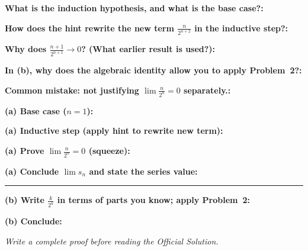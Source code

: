 \documentclass[12pt]{article}
\newcommand{\fillfield}[1]{%
  \par\noindent\textbf{#1:}\enspace\hrulefill\par\vspace{3pt}%
}
\newcommand{\writespace}[1]{\vspace{#1}}
\begin{document}
\bigskip

\begin{tcolorbox}[
  enhanced, breakable,
  colback  = pass3orange,
  colframe = orange!65!black,
  fonttitle = \bfseries,
  title = {Pass 3 \enspace\textbf{--}\enspace Self-Explanation}
]
\fillfield{What is the induction hypothesis, and what is the base case?}
\fillfield{How does the hint rewrite the new term $\frac{n}{2^{n+2}}$ in the inductive step?}
\fillfield{Why does $\frac{n+1}{2^{n+1}} \to 0$? (What earlier result is used?)}
\fillfield{In (b), why does the algebraic identity allow you to apply Problem~2?}
\fillfield{Common mistake: not justifying $\lim \frac{n}{2^n} = 0$ separately.}
\end{tcolorbox}

\newpage

\begin{tcolorbox}[
  enhanced, breakable,
  colback  = pass4purple,
  colframe = purple!55!black,
  fonttitle = \bfseries,
  title = {Pass 4 \enspace\textbf{--}\enspace Skeleton Proof}
]
\noindent\textbf{(a) Base case ($n=1$):}\par
\writespace{1.2cm}

\noindent\textbf{(a) Inductive step (apply hint to rewrite new term):}\par
\writespace{2.5cm}

\noindent\textbf{(a) Prove $\lim \frac{n}{2^n} = 0$ (squeeze):}\par
\writespace{1.8cm}

\noindent\textbf{(a) Conclude $\lim s_n$ and state the series value:}\par
\writespace{1.2cm}

\noindent\rule{\linewidth}{0.4pt}\vspace{2pt}

\noindent\textbf{(b) Write $\frac{k}{2^k}$ in terms of parts you know; apply Problem~2:}\par
\writespace{2.0cm}

\noindent\textbf{(b) Conclude:}\par
\writespace{1.0cm}
\end{tcolorbox}

\newpage

\begin{tcolorbox}[
  enhanced, breakable,
  colback  = pass5gray,
  colframe = black!38,
  fonttitle = \bfseries,
  title = {Pass 5 \enspace\textbf{--}\enspace Full Proof Attempt}
]
\small\itshape Write a complete proof before reading the Official Solution.\par
\normalfont\normalsize
\writespace{19cm}
\end{tcolorbox}
\end{document}
